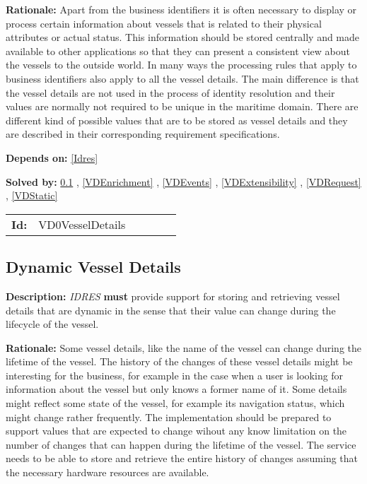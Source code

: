 \textbf{Rationale:} Apart from the business identifiers it is often necessary to display or process certain information about vessels that is related to  their physical attributes or actual status. This information should be  stored centrally and made available to other applications so that they can present a consistent view about the vessels to the outside world.  In many ways the processing  rules that apply to business identifiers also apply to all the vessel details. The main difference is that the vessel details are not used in the process of identity resolution and their values are normally not required to  be unique in the maritime domain. There are different kind of possible  values that are to be stored as vessel details and they are described in their corresponding requirement specifications.

\textbf{Depends on:} \ref{Idres} 

\textbf{Solved by:} \ref{VDDynamic} , \ref{VDEnrichment} , \ref{VDEvents} , \ref{VDExtensibility} , \ref{VDRequest} , \ref{VDStatic} 

\par
{\small \begin{center}\begin{tabular}{rlrlrl}
\textbf{Id:} & VD0VesselDetails  & & & \end{tabular}\end{center} }

\subsection{Dynamic Vessel Details}\label{VDDynamic}
\textbf{Description:} \textsl{IDRES} \textbf{must} provide support for storing and retrieving vessel details that are dynamic in the sense that their value can change during the lifecycle of the vessel.

\textbf{Rationale:} Some vessel details, like the name of the vessel can change during  the lifetime of the vessel. The history of the changes of these vessel  details might be interesting for the business, for example in the  case when a user is looking for information about the vessel but only knows a former name of it. Some details might reflect some state of the vessel, for example its navigation status, which might change rather frequently.  The implementation should be prepared to support values that  are expected to change wihout any know limitation on the number  of changes that can happen during the lifetime of the vessel. The service needs to be able to store and retrieve the entire history  of changes assuming that the necessary hardware resources are available.

